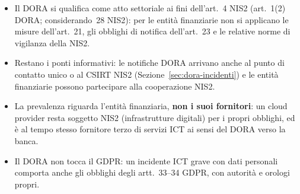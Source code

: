 \begin{integrazione}
\begin{itemize}
  \item Il DORA si qualifica come atto settoriale ai fini dell'art.~4 NIS2 (art.~1(2) DORA;
    considerando~28 NIS2): per le entità finanziarie non si applicano le misure dell'art.~21, gli
    obblighi di notifica dell'art.~23 e le relative norme di vigilanza della NIS2.
  \item Restano i ponti informativi: le notifiche DORA arrivano anche al punto di contatto unico o al
    CSIRT NIS2 (Sezione~\ref{sec:dora-incidenti}) e le entità finanziarie possono partecipare alla
    cooperazione NIS2.
  \item La prevalenza riguarda l'entità finanziaria, \textbf{non i suoi fornitori}: un cloud provider
    resta soggetto NIS2 (infrastrutture digitali) per i propri obblighi, ed è al tempo stesso fornitore
    terzo di servizi ICT ai sensi del DORA verso la banca.
  \item Il DORA non tocca il GDPR: un incidente ICT grave con dati personali comporta anche gli
    obblighi degli artt.~33--34 GDPR, con autorità e orologi propri.
\end{itemize}
\end{integrazione}

